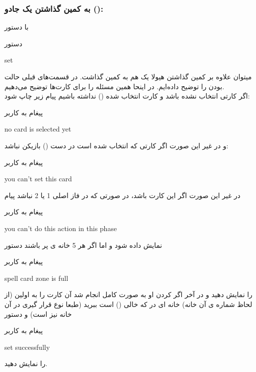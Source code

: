 \documentclass[]{article}
\begin{document}
\subsubsection*{{\titr به کمین گذاشتن یک جادو ():}}
با دستور 
\begin{mybox}[colback=yellow]{دستور}
	\begin{latin}	
	    set 	
	\end{latin}
\end{mybox}
میتوان علاوه بر کمین گذاشتن هیولا یک  هم به کمین گذاشت. در قسمت‌های 
قبلی حالت  بودن را توضیح داده‌ایم. در اینحا همین مسئله را برای 
 کارت‌ها توضیح می‌دهیم.
\\
اگر کارتی انتخاب نشده باشد و کارت انتخاب شده () نداشته باشیم 
پیام زیر چاپ شود:
\begin{mybox}[colback=yellow]{پیغام به کاربر}
	\begin{latin}	
		no card is selected yet
	\end{latin}
\end{mybox}
و در غیر این صورت اگر کارتی که انتخاب شده است در دست () بازیکن 
نباشد:
\begin{mybox}[colback=yellow]{پیغام به کاربر}
	\begin{latin}	
		you can’t set this card	
	\end{latin}
\end{mybox}
در غیر این صورت اگر این کارت  باشد، در صورتی که در فاز اصلی 1 یا 2 
نباشد پیام
\begin{mybox}[colback=yellow]{پیغام به کاربر}
	\begin{latin}	
		you can’t do this action in this phase
	\end{latin}
\end{mybox}
نمایش داده شود و اما اگر هر 5 خانه ی  پر باشند دستور
\begin{mybox}[colback=yellow]{پیغام به کاربر}
	\begin{latin}	
		spell card zone is full
	\end{latin}
\end{mybox}
را نمایش دهید و در آخر اگر  کردن او به صورت کامل انجام شد آن کارت را 
به اولین (از لحاظ شماره ی آن خانه) خانه ای در  که خالی 
() است ببرید (طبعا نوع قرار گیری در آن خانه نیز  است) و 
دستور
\begin{mybox}[colback=yellow]{پیغام به کاربر}
	\begin{latin}	
		set successfully
	\end{latin}
\end{mybox}
را نمایش دهید.
\end{document}
